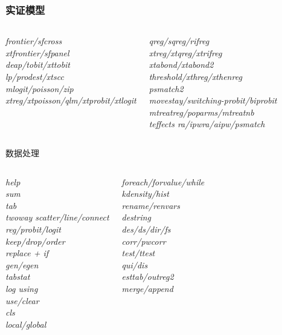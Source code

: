 \documentclass[11pt,mathserif]{beamer} %
\begin{document}
\begin{frame}
  \frametitle{实证模型}

	\begin{columns}
 		\textit{frontier/sfcross}\\
 		\textit{xtfrontier/sfpanel}\\
 		\textit{deap/tobit/xttobit}\\
 		\textit{lp/prodest/xtscc}\\
 		\textit{mlogit/poisson/zip}\\
 		\textit{xtreg/xtpoisson/qlm/xtprobit/xtlogit}


 		\textit{qreg/sqreg/rifreg}\\
 		\textit{xtreg/xtqreg/xtrifreg}\\
 		\textit{xtabond/xtabond2}\\
 		\textit{threshold/xthreg/xthenreg}\\
 		\textit{psmatch2}\\
 		\textit{movestay/switching-probit/biprobit}\\
 		\textit{mtreatreg/poparms/mtreatnb}\\
 		\textit{teffects ra/ipwra/aipw/psmatch}

	\end{columns}

\end{frame}


\begin{frame}{数据处理}
	\begin{columns}
    	\column{0.5\textwidth}
 		\textit{help}\\
 		\textit{sum}\\
 		\textit{tab}\\
 		\textit{twoway scatter/line/connect}\\
 		\textit{reg/probit/logit}\\
 		\textit{keep/drop/order}\\
 		\textit{replace + if}\\
 		\textit{gen/egen}\\
 		\textit{tabstat}\\
 		\textit{log using}\\
 		\textit{use/clear}\\
 		\textit{cls}\\
 		\textit{local/global}
    
    	\column{0.5\textwidth}
 		\textit{foreach/forvalue/while}\\
 		\textit{kdensity/hist}\\
 		\textit{rename/renvars}\\
 		\textit{destring}\\
 		\textit{des/ds/dir/fs}\\
 		\textit{corr/pwcorr}\\
 		\textit{test/ttest}\\
 		\textit{qui/dis}\\
 		\textit{esttab/outreg2}\\
 		\textit{merge/append}

	\end{columns}
\end{frame}
\end{document}
